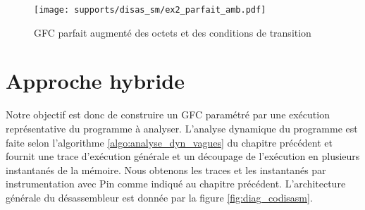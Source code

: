 \begin{figure}[h]
\begin{center}
  \texttt{[image: supports/disas\_sm/ex2\_parfait\_amb.pdf]}
\end{center}
\caption{GFC parfait augmenté des octets et des conditions de transition}
\label{fig:sm_cfg_parfait_amb}
\end{figure}

\FloatBarrier
\section{Approche hybride}

Notre objectif est donc de construire un GFC paramétré par une exécution représentative du programme à analyser.
L'analyse dynamique du programme est faite selon l'algorithme \ref{algo:analyse_dyn_vagues} du chapitre précédent et fournit une trace d'exécution générale et un découpage de l'exécution en plusieurs instantanés de la mémoire.
Nous obtenons les traces et les instantanés par instrumentation avec Pin comme indiqué au chapitre précédent.
L'architecture générale du désassembleur est donnée par la figure \ref{fig:diag_codisasm}.

